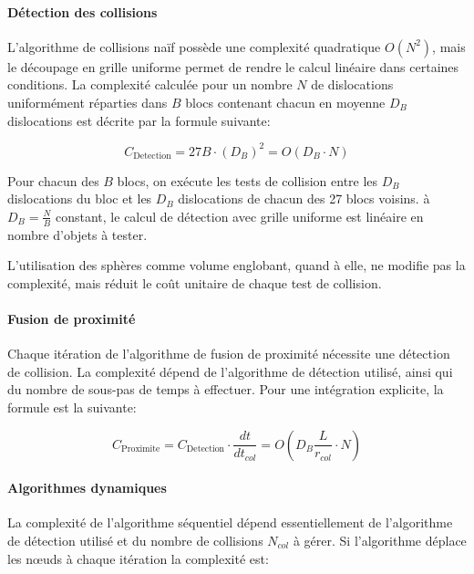 \documentclass[11pt,class=article,float=false,crop=false]{standalone}
\begin{document}
\paragraph{Détection des collisions}

L'algorithme de collisions naïf possède une complexité quadratique $O(N^2)$, mais le découpage en grille uniforme permet de rendre le calcul linéaire dans certaines conditions. La complexité calculée pour un nombre $N$ de dislocations uniformément réparties dans $B$ blocs contenant chacun en moyenne $D_B$ dislocations est décrite par la formule suivante: 

\begin{equation}
C_\text{Detection} = 27B \cdot ( D_B ) ^2 = O( D_B \cdot{N} )
\label{for:complexite_detection_grille}
\end{equation}

Pour chacun des $B$ blocs, on exécute les tests de collision entre les $D_B$ dislocations du bloc et les $D_B$ dislocations de chacun des 27 blocs voisins. à $D_B = \frac{N}{B}$ constant, le calcul de détection avec grille uniforme est linéaire en nombre d'objets à tester.

L'utilisation des sphères comme volume englobant, quand à elle, ne modifie pas la complexité, mais réduit le coût unitaire de chaque test de collision.

\paragraph{Fusion de proximité}

Chaque itération de l'algorithme de fusion de proximité nécessite une détection de collision. La complexité dépend de l'algorithme de détection utilisé, ainsi qui du nombre de sous-pas de temps à effectuer. Pour une intégration explicite, la formule est la suivante:

\begin{equation}
C_\text{Proximite} = C_\text{Detection} \cdot \frac{dt}{dt_{col}} = O( D_B \frac{L}{r_{col}}\cdot N )
\end{equation}

\paragraph{Algorithmes dynamiques}

La complexité de l'algorithme séquentiel dépend essentiellement de l'algorithme de détection utilisé et du nombre de collisions $N_{col}$ à gérer. Si l'algorithme déplace les nœuds à chaque itération la complexité est:
\end{document}
